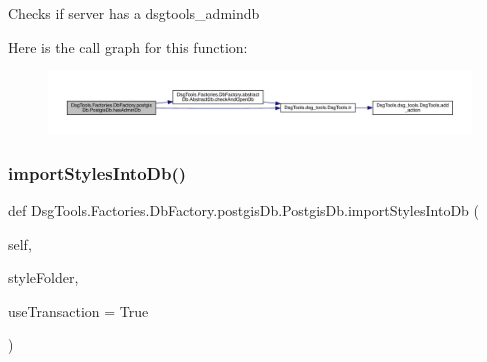 \begin{DoxyVerb}Checks if server has a dsgtools_admindb
\end{DoxyVerb}
 Here is the call graph for this function\+:
\nopagebreak
\begin{figure}[H]
\begin{center}
\leavevmode
\includegraphics[width=350pt]{class_dsg_tools_1_1_factories_1_1_db_factory_1_1postgis_db_1_1_postgis_db_a30b0ce8ef3ba4e2d9c712a419d99d659_cgraph}
\end{center}
\end{figure}
\mbox{\label{class_dsg_tools_1_1_factories_1_1_db_factory_1_1postgis_db_1_1_postgis_db_ac42464167014927751a4ad7133f34197}} 
\subsubsection{\texorpdfstring{import\+Styles\+Into\+Db()}{importStylesIntoDb()}}
{\footnotesize\ttfamily def Dsg\+Tools.\+Factories.\+Db\+Factory.\+postgis\+Db.\+Postgis\+Db.\+import\+Styles\+Into\+Db (\begin{DoxyParamCaption}\item[{}]{self,  }\item[{}]{style\+Folder,  }\item[{}]{use\+Transaction = {\ttfamily True} }\end{DoxyParamCaption})}


